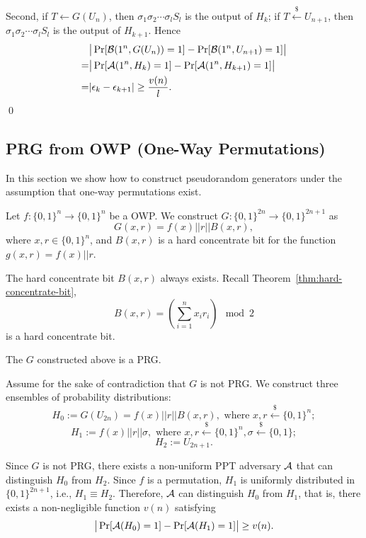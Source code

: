Second, if $T\gets G(U_n)$, then $\sigma_1 \sigma_2 \cdots \sigma_l S_l$ is the output of  $H_{k}$; if $T \stackrel{\$}\leftarrow U_{n+1}$, then $\sigma_1 \sigma_2 \cdots \sigma_l S_l$ is the output of $H_{k+1}$.
Hence
\begin{align*}
&\big|\Pr[\mathcal{B}(1^n, G(U_n)) = 1] - \Pr[\mathcal{B}(1^n, U_{n+1}) = 1]\big|\\
=& \big|\Pr[\mathcal{A}(1^n,H_k) = 1] - \Pr[\mathcal{A}(1^n,H_{k+1}) = 1]\big|\\
=&
|\epsilon_{k} - \epsilon_{k+1}| \geq \frac{v(n)}{l}.
\end{align*}
\qed

\subsection{PRG from OWP (One-Way Permutations)}
In this section we show how to construct pseudorandom generators under the assumption that one-way permutations exist.

\begin{construction}
Let $f: \{0, 1\}^n \rightarrow \{0, 1\}^n$ be a OWP. We construct $G: \{0, 1\}^{2n} \rightarrow \{0, 1\}^{2n+1}$ as
\[
G(x, r) = f(x) || r || B(x, r),
\]
where $x, r \in \{0, 1\}^n$, and $B(x, r)$ is a hard concentrate bit for the function $g(x,r) = f(x) || r$.
\end{construction}

\begin{remark}
The hard concentrate bit $B(x,r)$ always exists. Recall Theorem~\ref{thm:hard-concentrate-bit},
\[B(x,r) = \left(\sum_{i=1}^n x_i r_i\right)\mod 2\]
is a hard concentrate bit.
\end{remark}

\begin{theorem}
The $G$ constructed above is a PRG.
\end{theorem}

\proof
Assume for the sake of contradiction that $G$ is not PRG.
We construct three ensembles of probability distributions:
\[H_0 := G(U_{2n}) = f(x) || r || B(x, r), \text{ where } x, r \xleftarrow{\$} \{0, 1\}^n;\]
\[H_1 := f(x) || r || \sigma, \text{ where } x, r \xleftarrow{\$} \{0, 1\}^n, \sigma \xleftarrow{\$} \{0, 1\};\]
\[H_2 := U_{2n+1}.\]

Since $G$ is not PRG, there exists a non-uniform PPT adversary $\mathcal{A}$ that can distinguish $H_0$ from $H_2$.
Since $f$ is a permutation, $H_1$ is uniformly distributed in $\{0, 1\}^{2n+1}$, i.e., $H_1 \equiv H_2$.
Therefore, $\mathcal{A}$ can distinguish $H_0$ from $H_1$,
that is, there exists a non-negligible function $v(n)$ satisfying
\[
\big| \Pr[\mathcal{A}(H_0)=1] - \Pr[\mathcal{A}(H_1)=1] \big| \geq v(n).
\]

